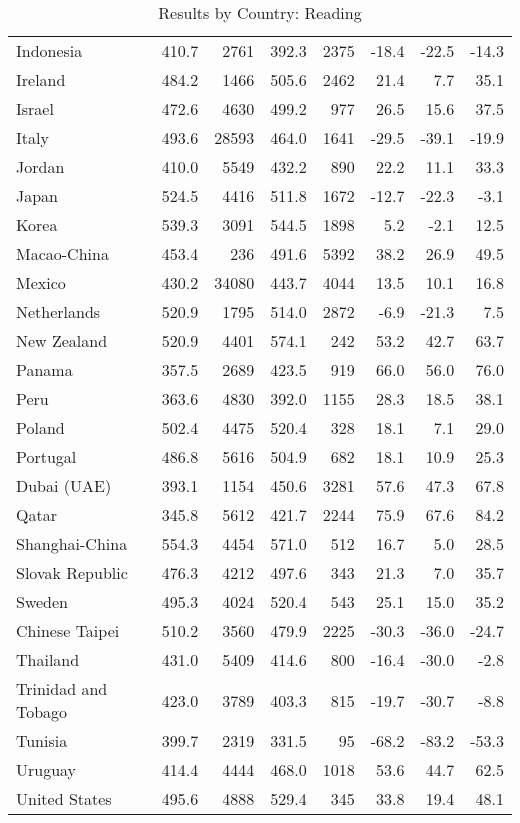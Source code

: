 \begin{table}[ht]
\begin{center}
{\begin{tabular}{lrr@{\extracolsep{10pt}}rr@{\extracolsep{10pt}}rrr}
  Indonesia & 410.7 & 2761 & 392.3 & 2375 & -18.4 & -22.5 & -14.3 \\ 
  Ireland & 484.2 & 1466 & 505.6 & 2462 & 21.4 & 7.7 & 35.1 \\ 
  Israel & 472.6 & 4630 & 499.2 & 977 & 26.5 & 15.6 & 37.5 \\ 
  Italy & 493.6 & 28593 & 464.0 & 1641 & -29.5 & -39.1 & -19.9 \\ 
  Jordan & 410.0 & 5549 & 432.2 & 890 & 22.2 & 11.1 & 33.3 \\ 
  Japan & 524.5 & 4416 & 511.8 & 1672 & -12.7 & -22.3 & -3.1 \\ 
  Korea & 539.3 & 3091 & 544.5 & 1898 & 5.2 & -2.1 & 12.5 \\ 
  Macao-China & 453.4 & 236 & 491.6 & 5392 & 38.2 & 26.9 & 49.5 \\ 
  Mexico & 430.2 & 34080 & 443.7 & 4044 & 13.5 & 10.1 & 16.8 \\ 
  Netherlands & 520.9 & 1795 & 514.0 & 2872 & -6.9 & -21.3 & 7.5 \\ 
  New Zealand & 520.9 & 4401 & 574.1 & 242 & 53.2 & 42.7 & 63.7 \\ 
  Panama & 357.5 & 2689 & 423.5 & 919 & 66.0 & 56.0 & 76.0 \\ 
  Peru & 363.6 & 4830 & 392.0 & 1155 & 28.3 & 18.5 & 38.1 \\ 
  Poland & 502.4 & 4475 & 520.4 & 328 & 18.1 & 7.1 & 29.0 \\ 
  Portugal & 486.8 & 5616 & 504.9 & 682 & 18.1 & 10.9 & 25.3 \\ 
  Dubai (UAE) & 393.1 & 1154 & 450.6 & 3281 & 57.6 & 47.3 & 67.8 \\ 
  Qatar & 345.8 & 5612 & 421.7 & 2244 & 75.9 & 67.6 & 84.2 \\ 
  Shanghai-China & 554.3 & 4454 & 571.0 & 512 & 16.7 & 5.0 & 28.5 \\ 
  Slovak Republic & 476.3 & 4212 & 497.6 & 343 & 21.3 & 7.0 & 35.7 \\ 
  Sweden & 495.3 & 4024 & 520.4 & 543 & 25.1 & 15.0 & 35.2 \\ 
  Chinese Taipei & 510.2 & 3560 & 479.9 & 2225 & -30.3 & -36.0 & -24.7 \\ 
  Thailand & 431.0 & 5409 & 414.6 & 800 & -16.4 & -30.0 & -2.8 \\ 
  Trinidad and Tobago & 423.0 & 3789 & 403.3 & 815 & -19.7 & -30.7 & -8.8 \\ 
  Tunisia & 399.7 & 2319 & 331.5 & 95 & -68.2 & -83.2 & -53.3 \\ 
  Uruguay & 414.4 & 4444 & 468.0 & 1018 & 53.6 & 44.7 & 62.5 \\ 
  United States & 495.6 & 4888 & 529.4 & 345 & 33.8 & 19.4 & 48.1 \\ 
   \hline
\end{tabular}
}
\caption{Results by Country: Reading}
\label{level2read}
\end{center}
\end{table}
